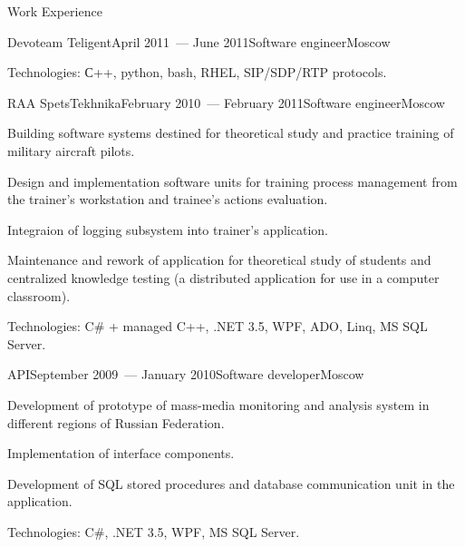 \documentclass{resume} %
\begin{document}
\begin{rSection}{Work Experience}
\begin{rSubsection}{Devoteam Teligent}{April 2011~--- June 2011}{Software engineer}{Moscow}
\item Technologies: С++, python, bash, RHEL, SIP/SDP/RTP protocols.
\end{rSubsection}


\begin{rSubsection}{RAA SpetsTekhnika}{February 2010~--- February 2011}{Software engineer}{Moscow}

\item Building software systems destined for theoretical study and practice training of military aircraft pilots.

\item Design and implementation software units for training process management from the trainer's 
workstation and trainee's actions evaluation.

\item Integraion of logging subsystem into trainer's application.

\item Maintenance and rework of application for theoretical study of students and centralized knowledge testing
(a distributed application for use in a computer classroom).

\item Technologies: C\# + managed C++, .NET 3.5, WPF, ADO, Linq, MS SQL Server.
\end{rSubsection}


\begin{rSubsection}{API}{September 2009~--- January 2010}{Software developer}{Moscow}
\item Development of prototype of mass-media monitoring and analysis system in different regions 
of Russian Federation.

\item Implementation of interface components.

\item Development of SQL stored procedures and database communication unit in the application.

\item Technologies: C\#, .NET 3.5, WPF, MS SQL Server.
\end{rSubsection}

\end{rSection}

\end{document}
